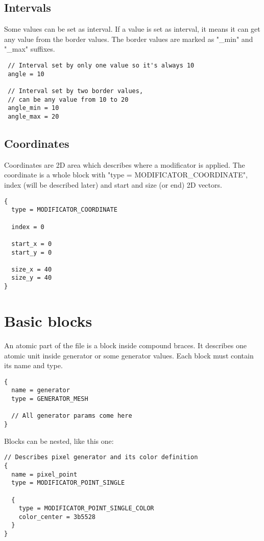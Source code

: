 \documentclass[11pt]{article}
\begin{document}
\subsection{Intervals}

Some values can be set as interval. If a value is set as interval,
it means it can get any value from the border values. The border values
are marked as "\_min" and "\_max" suffixes.

\begin{verbatim}
 // Interval set by only one value so it's always 10
 angle = 10

 // Interval set by two border values, 
 // can be any value from 10 to 20
 angle_min = 10
 angle_max = 20
\end{verbatim}

\subsection{Coordinates}

Coordinates are 2D area which describes 
where a modificator is applied.  The coordinate is a whole 
block with "type = MODIFICATOR\_COORDINATE", index (will be described later)
and start and size (or end) 2D vectors.

\begin{verbatim}
{
  type = MODIFICATOR_COORDINATE

  index = 0

  start_x = 0
  start_y = 0

  size_x = 40
  size_y = 40
}
\end{verbatim}

\section{Basic blocks}

An atomic part of the file is a block inside compound braces. It describes one 
atomic unit inside generator or some generator values. Each block must
contain its name and type.

\begin{verbatim}
{
  name = generator
  type = GENERATOR_MESH

  // All generator params come here
}
\end{verbatim}

Blocks can be nested, like this one:

\begin{verbatim}
// Describes pixel generator and its color definition
{
  name = pixel_point
  type = MODIFICATOR_POINT_SINGLE

  {
    type = MODIFICATOR_POINT_SINGLE_COLOR    
    color_center = 3b5528
  }
}
\end{verbatim}
\end{document}
